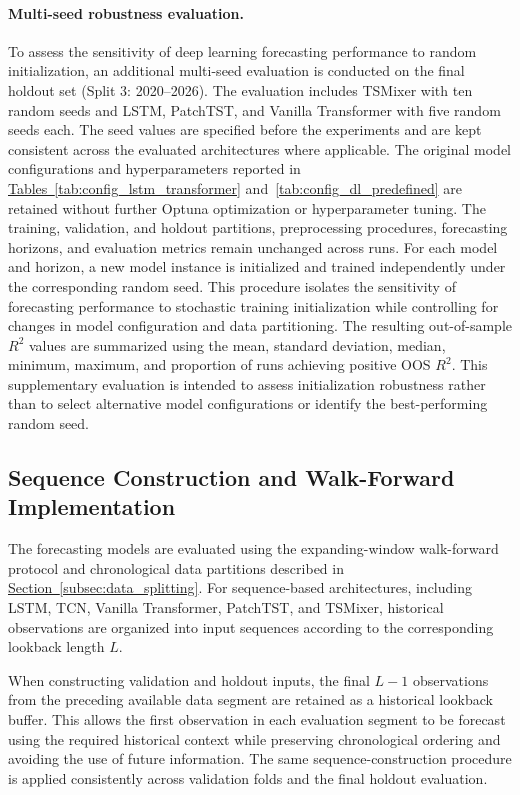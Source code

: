 \documentclass[12pt,twoside]{ord}
\begin{document}
\paragraph{Multi-seed robustness evaluation.} To assess the sensitivity of deep learning forecasting performance to random initialization, an additional multi-seed evaluation is conducted on the final holdout set (Split 3: 2020--2026). The evaluation includes TSMixer with ten random seeds and LSTM, PatchTST, and Vanilla Transformer with five random seeds each. The seed values are specified before the experiments and are kept consistent across the evaluated architectures where applicable. The original model configurations and hyperparameters reported in \hyperref[tab:config_lstm_transformer]{Tables~\ref*{tab:config_lstm_transformer}} and~\hyperref[tab:config_dl_predefined]{\ref*{tab:config_dl_predefined}} are retained without further Optuna optimization or hyperparameter tuning. The training, validation, and holdout partitions, preprocessing procedures, forecasting horizons, and evaluation metrics remain unchanged across runs. For each model and horizon, a new model instance is initialized and trained independently under the corresponding random seed. This procedure isolates the sensitivity of forecasting performance to stochastic training initialization while controlling for changes in model configuration and data partitioning. The resulting out-of-sample $R^2$ values are summarized using the mean, standard deviation, median, minimum, maximum, and proportion of runs achieving positive OOS $R^2$. This supplementary evaluation is intended to assess initialization robustness rather than to select alternative model configurations or identify the best-performing random seed.

\subsection{Sequence Construction and Walk-Forward Implementation}\label{subsec:walk_forward}

The forecasting models are evaluated using the expanding-window walk-forward protocol and chronological data partitions described in \hyperref[subsec:data_splitting]{Section~\ref*{subsec:data_splitting}}. For sequence-based architectures, including LSTM, TCN, Vanilla Transformer, PatchTST, and TSMixer, historical observations are organized into input sequences according to the corresponding lookback length $L$.

When constructing validation and holdout inputs, the final $L-1$ observations from the preceding available data segment are retained as a historical lookback buffer. This allows the first observation in each evaluation segment to be forecast using the required historical context while preserving chronological ordering and avoiding the use of future information. The same sequence-construction procedure is applied consistently across validation folds and the final holdout evaluation.
\end{document}
